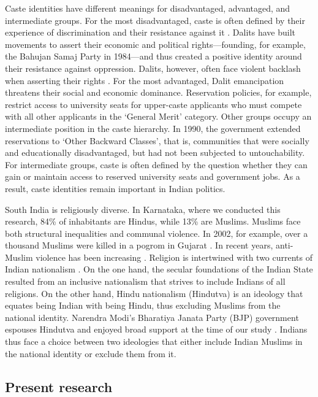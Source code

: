 \documentclass[12pt, a4paper]{article}
\begin{document}
Caste identities have different meanings for disadvantaged, advantaged, and intermediate groups. For the most disadvantaged, caste is often defined by their experience of discrimination and their resistance against it \parencite{jodhka_caste_2012}. Dalits have built movements to assert their economic and political rights---founding, for example, the Bahujan Samaj Party in 1984---and thus created a positive identity around their resistance against oppression. Dalits, however, often face violent backlash when asserting their rights \parencite[e.g.,][]{noauthor_15_2017}. For the most advantaged, Dalit emancipation threatens their social and economic dominance. Reservation policies, for example, restrict access to university seats for upper-caste applicants who must compete with all other applicants in the ‘General Merit’ category. Other groups occupy an intermediate position in the caste hierarchy. In 1990, the government extended reservations to ‘Other Backward Classes’, that is, communities that were socially and educationally disadvantaged, but had not been subjected to untouchability. For intermediate groups, caste is often defined by the question whether they can gain or maintain access to reserved university seats and government jobs. As a result, caste identities remain important in Indian politics.

South India is religiously diverse. In Karnataka, where we conducted this research, 84\% of inhabitants are Hindus, while 13\% are Muslims. Muslims face both structural inequalities and communal violence. In 2002, for example, over a thousand Muslims were killed in a pogrom in Gujarat \parencite{dhattiwala_political_2012}. In recent years, anti-Muslim violence has been increasing \parencite{amnesty_international_india:_2017}. Religion is intertwined with two currents of Indian nationalism \parencite{katz_hindu_2009}. On the one hand, the secular foundations of the Indian State resulted from an inclusive nationalism that strives to include Indians of all religions. On the other hand, Hindu nationalism (Hindutva) is an ideology that equates being Indian with being Hindu, thus excluding Muslims from the national identity. Narendra Modi’s Bharatiya Janata Party (BJP) government espouses Hindutva and enjoyed broad support at the time of our study \parencite{pew_research_center_three_2017}. Indians thus face a choice between two ideologies that either include Indian Muslims in the national identity or exclude them from it.

\subsection{Present research}
\end{document}
